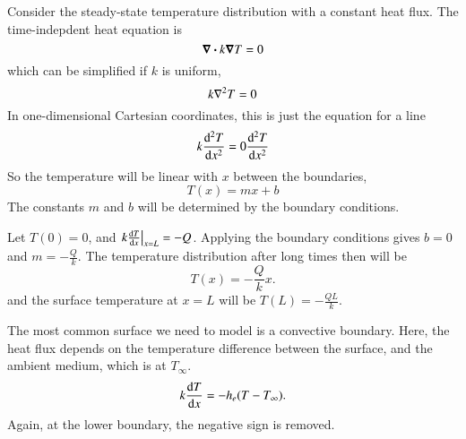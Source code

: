 \documentclass[letterpaper,12pt]{article}
\begin{document}
Consider the steady-state temperature distribution with a constant heat flux. The time-indepdent heat equation is
\begin{equation}
  \label{eq:steady_heat_eq}
  \div{ k \grad {T} } = 0
\end{equation}
which can be simplified if $k$ is uniform,
\begin{equation}
  \label{eq:steady_heat_eq_simp}
  k \laplacian T = 0
\end{equation}
In one-dimensional Cartesian coordinates, this is just the equation for a line
\begin{equation}
  \label{eq:steady_heat_eq_1d_cart}
  k \dv[2]{T}{x} = 0 \dv[2]{T}{x}
\end{equation}
So the temperature will be linear with $x$ between the boundaries,
\begin{equation}
  T(x) = m x + b
\end{equation}
The constants $m$ and $b$ will be determined by the boundary conditions.

Let $T(0) = 0$, and $\left.k\dv{T}{x} \right|_{x = L} = -Q$. Applying the boundary conditions gives $b = 0$ and $m = -\frac{Q}{k}$. The temperature
distribution after long times then will be
\begin{equation}
  T(x) = -\frac{Q}{k} x.
\end{equation}
and the surface temperature at $x = L$ will be $T(L) = -\frac{QL}{k}$.

The most common surface we need to model is a convective boundary. Here, the heat flux depends on the temperature difference
between the surface, and the ambient medium, which is at $T_\infty$.
\begin{equation}
  \label{eq:conv_bc}
  k \dv{T}{x} = -h_e(T - T_\infty).
\end{equation}
Again, at the lower boundary, the negative sign is removed.
\end{document}
